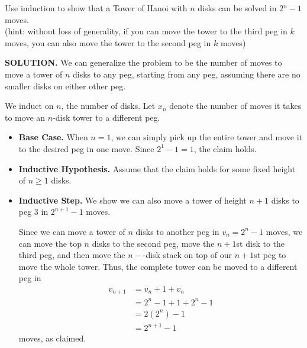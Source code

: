 \documentclass[11pt]{article}
\begin{document}
Use induction to show that a Tower of Hanoi with $n$ disks can be solved in $2^n-1$ moves. \\

(hint: without loss of generality, if you can move the tower to the third peg in $k$ moves, you can also move the tower to the second peg in $k$ moves)

\begin{framed}
	\noindent\textbf{SOLUTION.} We can generalize the problem to be the number of moves to move a tower of $n$ disks to any peg, starting from any peg, assuming there are no smaller disks on either other peg.

	We induct on $n$, the number of disks. Let $x_n$ denote the number of moves it takes to move an $n$-disk tower to a different peg.
	\begin{itemize}
		\item[]\textbf{Base Case.} When $n = 1$, we can simply pick up the entire tower and move it to the desired peg in one move. Since $2^1 - 1 = 1$, the claim holds.
		\item[]\textbf{Inductive Hypothesis.} Assume that the claim holds for some fixed height of $n\geq 1$ disks.
		\item[]\textbf{Inductive Step.}  We show we can also move a tower of height $n+1$ disks to peg 3 in $2^{n+1} - 1$ moves.

		Since we can move a tower of $n$ disks to another peg in $v_n = 2^n-1$ moves, we can move the top $n$ disks to the second peg, move the $n+1$st disk to the third peg, and then move the $n-$-disk stack on top of our $n+1$st peg to move the whole tower. Thus, the complete tower can be moved to a different peg in
		\begin{align*}
			v_{n+1} &= v_n + 1 + v_n\\
			&= 2^n - 1 + 1 + 2^n - 1\\
			&= 2(2^n) - 1\\
			&= 2^{n+1} - 1
		\end{align*}
		moves, as claimed.
	\end{itemize}
\end{framed}
\end{document}

